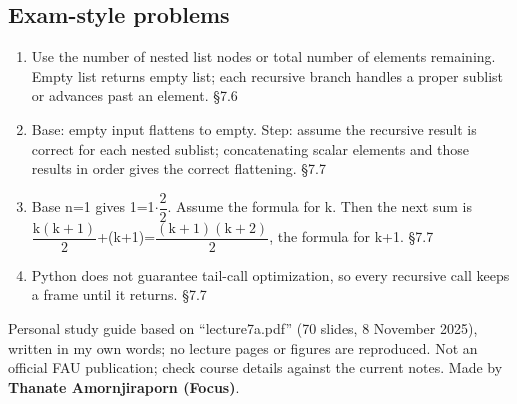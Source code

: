\documentclass[11pt]{article}
\begin{document}
\begin{keepsection}\subsection{Exam-style problems}

\begin{enumerate}
\item Use the number of nested list nodes or total number of elements remaining. Empty list returns empty list; each recursive branch handles a proper sublist or advances past an element. \hfill{\small\color{FAUblue}§7.6}
\item Base: empty input flattens to empty. Step: assume the recursive result is correct for each nested sublist; concatenating scalar elements and those results in order gives the correct flattening. \hfill{\small\color{FAUblue}§7.7}
\item Base n=1 gives 1=1\ensuremath{\cdot}{\small\ensuremath{\dfrac{2}{2}}}. Assume the formula for k. Then the next sum is {\small\ensuremath{\dfrac{\mathrm{k}(\mathrm{k}+1)}{2}}}+(k+1)={\small\ensuremath{\dfrac{(\mathrm{k}+1)(\mathrm{k}+2)}{2}}}, the formula for k+1. \hfill{\small\color{FAUblue}§7.7}
\item Python does not guarantee tail-call optimization, so every recursive call keeps a frame until it returns. \hfill{\small\color{FAUblue}§7.7}
\end{enumerate}

\end{keepsection}

\vfill{\small Personal study guide based on “lecture7a.pdf” (70 slides, 8 November 2025), written in my own words; no lecture pages or figures are reproduced. Not an official FAU publication; check course details against the current notes. Made by \textbf{Thanate Amornjiraporn (Focus)}.}
\end{document}

